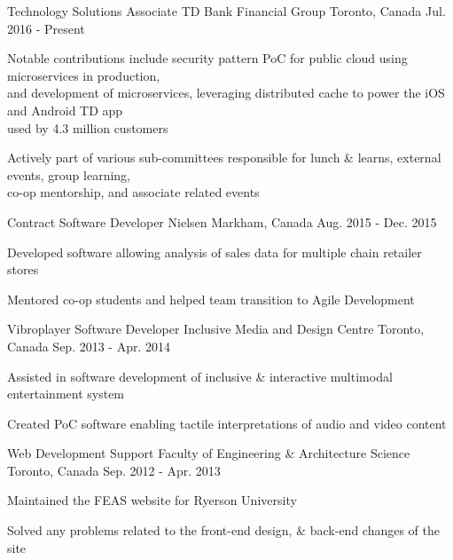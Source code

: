\begin{cventries}
  \cventry
    {Technology Solutions Associate}
    {TD Bank Financial Group}
    {Toronto, Canada}
    {Jul. 2016 - Present}
    {
      \begin{cvitems}
        \item {Notable contributions include security pattern PoC for public cloud using microservices in production, \\ and development of microservices, leveraging distributed cache to power the iOS and Android TD app \\used by 4.3 million customers}
        \item {Actively part of various sub-committees responsible for lunch \& learns, external events, group learning, \\ co-op mentorship, and associate related events}
      \end{cvitems}
    }
  \cventry
    {Contract Software Developer}
    {Nielsen}
    {Markham, Canada}
    {Aug. 2015 - Dec. 2015}
    {
      \begin{cvitems}
        \item {Developed software allowing analysis of sales data for multiple chain retailer stores}
        \item {Mentored co-op students and helped team transition to Agile Development}
      \end{cvitems}
    }
  \cventry
    {Vibroplayer Software Developer}
    {Inclusive Media and Design Centre}
    {Toronto, Canada}
    {Sep. 2013 - Apr. 2014}
    {
      \begin{cvitems}
        \item {Assisted in software development of inclusive \& interactive multimodal entertainment system}
        \item {Created PoC software enabling tactile interpretations of audio and video content}
      \end{cvitems}
    }
 \cventry
   {Web Development Support}
    {Faculty of Engineering \& Architecture Science}
    {Toronto, Canada}
    {Sep. 2012 - Apr. 2013}
    {
      \begin{cvitems}
        \item {Maintained the FEAS website for Ryerson University}
        \item {Solved any problems related to the front-end design, \& back-end changes of the site}
     \end{cvitems}
    }
\end{cventries}
